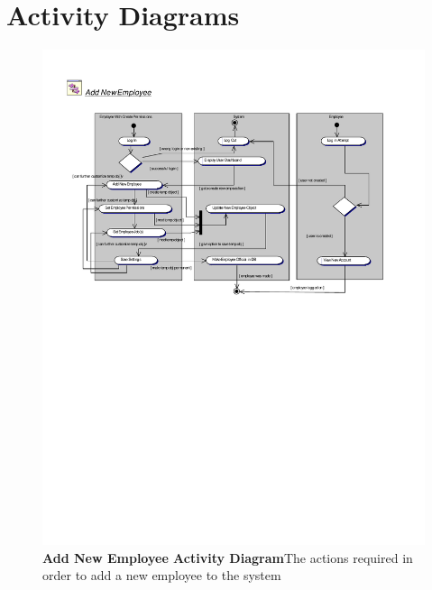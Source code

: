 \documentclass[letterpaper,12pt]{report}
\begin{document}
\section{Activity Diagrams}
\begin{figure}[hbp]
 \centering
 \includegraphics[scale=0.9,trim=20mm 100mm 25mm 10mm]{diagrams/ad_add1.pdf}
 \caption{\small
\textbf{Add New Employee Activity Diagram}\newline The actions required in order to add a new employee to the  system}\label{fig:act1}
\end{figure}
\newpage
\end{document}
